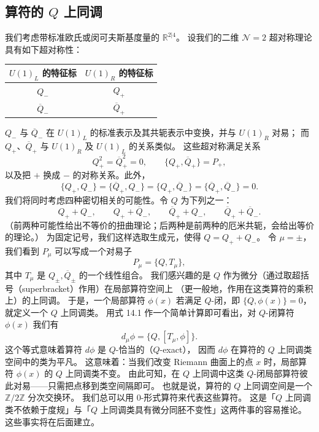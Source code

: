 
\subsection{算符的 $Q$ 上同调}

我们考虑带标准欧氏或闵可夫斯基度量的 $\mathbb{R}^{2|4}$。
设我们的二维 $\mathcal{N}=2$ 超对称理论具有如下超对称性：
\begin{center}
\begin{tabular}{c|c}
\hline
$U(1)_L$ 的特征标 & $U(1)_R$ 的特征标\\
\hline
$Q_-$ & $Q_+$\\
$\overline{Q}_-$ & $\overline{Q}_+$\\
\hline
\end{tabular}
\end{center}
$Q_-$ 与 $\overline{Q}_-$ 在 $U(1)_L$ 的标准表示及其共轭表示中变换，并与 $U(1)_R$ 对易；
而 $Q_+$、$\overline{Q}_+$ 与 $U(1)_R$ 及 $U(1)_L$ 的关系类似。
这些超对称满足关系
\[
Q_+^2=\overline{Q}_+^2=0,\qquad \{Q_+,\overline{Q}_+\}=P_+,
\]
以及把 $+$ 换成 $-$ 的对称关系。此外，
\[
\{Q_+,Q_-\}=\{\overline{Q}_+,Q_-\}=\{Q_+,\overline{Q}_-\}=\{\overline{Q}_+,\overline{Q}_-\}=0.
\]
我们将同时考虑四种密切相关的可能性。令 $Q$ 为下列之一：
\[
Q_++Q_-,\qquad Q_++\overline{Q}_-,\qquad \overline{Q}_++Q_-,\qquad \overline{Q}_++\overline{Q}_-.
\]
（前两种可能性给出不等价的扭曲理论；后两种是前两种的厄米共轭，会给出等价的理论。）
为固定记号，我们这样选取生成元，使得 $Q=Q_++Q_-$。
令 $\mu=\pm$，我们看到 $P_\mu$ 可以写成一个对易子
\begin{equation}
  \tag{14.1}
  \label{eq:14-1}
  P_\mu=\{Q,T_\mu\},
\end{equation}
其中 $T_\mu$ 是 $Q_\pm,\overline{Q}_\pm$ 的一个线性组合。
我们感兴趣的是 $Q$ 作为微分（通过取超括号（superbracket）作用）在局部算符空间上
（更一般地，作用在这类算符的乘积上）的上同调。
于是，一个局部算符 $\phi(x)$ 若满足 $Q$-闭，即 $\{Q,\phi(x)\}=0$，就定义一个 $Q$ 上同调类。
用式 14.1 作一个简单计算即可看出，对 $Q$-闭算符 $\phi(x)$ 我们有
\[
d_\mu\phi=\{Q,[T_\mu,\phi]\}.
\]
这个等式意味着算符 $d\phi$ 是 $Q$-恰当的（$Q$-exact），
因而 $d\phi$ 在算符的 $Q$ 上同调类空间中的类为平凡。
这意味着：当我们改变 Riemann 曲面上的点 $x$ 时，局部算符 $\phi(x)$ 的 $Q$ 上同调类不变。
由此可知，在 $Q$ 上同调中这类 $Q$-闭局部算符彼此对易——只需把点移到类空间隔即可。
也就是说，算符的 $Q$ 上同调空间是一个 $\mathbb{Z}/2\mathbb{Z}$ 分次交换环。
我们总可以用 $0$-形式算符来代表这些算符。
这是「$Q$ 上同调类不依赖于度规」与「$Q$ 上同调类具有微分同胚不变性」这两件事的容易推论。
这些事实将在后面建立。


